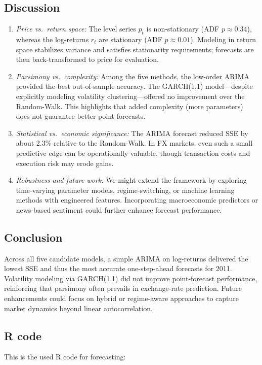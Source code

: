 \documentclass[11pt,a4paper]{article}
\begin{document}
    \subsection{Discussion}
    \begin{enumerate}[label=(\alph*), itemsep=1ex]
    \item \emph{Price vs.\ return space:}  
        The level series \(p_t\) is non-stationary (ADF \(p\approx0.34\)), whereas the log-returns \(r_t\) are stationary (ADF \(p\approx0.01\)).  Modeling in return space stabilizes variance and satisfies stationarity requirements; forecasts are then back-transformed to price for evaluation.
    \item \emph{Parsimony vs.\ complexity:}  
        Among the five methods, the low-order ARIMA provided the best out-of-sample accuracy.  The GARCH(1,1) model—despite explicitly modeling volatility clustering—offered no improvement over the Random-Walk.  This highlights that added complexity (more parameters) does not guarantee better point forecasts.
    \item \emph{Statistical vs.\ economic significance:}  
        The ARIMA forecast reduced SSE by about 2.3\% relative to the Random-Walk.  In FX markets, even such a small predictive edge can be operationally valuable, though transaction costs and execution risk may erode gains.
    \item \emph{Robustness and future work:}  
        We might extend the framework by exploring time-varying parameter models, regime-switching, or machine learning methods with engineered features.  Incorporating macroeconomic predictors or news-based sentiment could further enhance forecast performance.
    \end{enumerate}

    \subsection{Conclusion}
    Across all five candidate models, a simple ARIMA on log-returns delivered the lowest SSE and thus the most accurate one-step-ahead forecasts for 2011.  Volatility modeling via GARCH(1,1) did not improve point-forecast performance, reinforcing that parsimony often prevails in exchange-rate prediction.  Future enhancements could focus on hybrid or regime-aware approaches to capture market dynamics beyond linear autocorrelation.  

    \subsection{R code}
    This is the used R code for forecasting:
    
\end{document}
